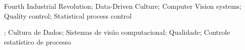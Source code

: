 \documentclass[msc, PT, VF]{ufabcFHZh}
\begin{document}

\maketitle

\frontmatter

\dedication{}

\begin{agradecimentos}
	
\end{agradecimentos}

\begin{epigrafe}
	
\end{epigrafe}

\begin{foreignabstract}
	
\end{foreignabstract}
\keywordeng
{Fourth Industrial Revolution};
{Data-Driven Culture};
{Computer Vision systems};
{Quality control};
{Statistical process control}

\begin{abstract}
	
\end{abstract}
;
{Cultura de Dados};
{Sistemas de visão computacional};
{Qualidade};
{Controle estatístico de processo}

\listoffigures
\end{document}
